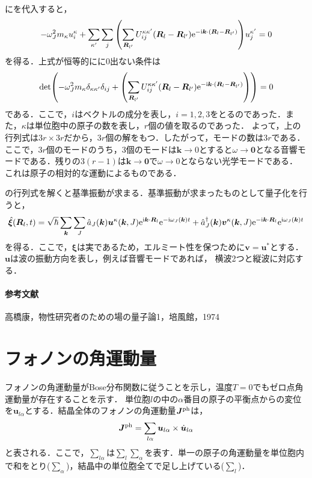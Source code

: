 \documentclass{report}
\begin{document}
にを代入すると，
\begin{align}
  -\omega_J^2 m_\kappa u_{i}^{\kappa} + \sum_{\kappa'} \sum_{j} \qty(\sum_{\bm{R}_{l'}} U_{ij}^{\kappa\kappa'}(\bm{R}_l - \bm{R}_{l'})\mathrm{e}^{-\mathrm{i}\bm{k}\cdot(\bm{R}_l-\bm{R}_{l'})}) u_j^{\kappa'}=0
\end{align}
を得る．上式が恒等的にに0出ない条件は
\begin{align}
  \det(-\omega_J^2 m_{\kappa}\delta_{\kappa\kappa'}\delta_{ij} + \qty(\sum_{\bm{R}_{l'}} U_{ij}^{\kappa\kappa'}(\bm{R}_l - \bm{R}_{l'})\mathrm{e}^{-\mathrm{i}\bm{k}\cdot(\bm{R}_l-\bm{R}_{l'})})) = 0 \label{det}
\end{align}
である．ここで，$i$はベクトルの成分を表し，$i=1,2,3$をとるのであった．また，$\kappa$は単位胞中の原子の数を表し，$r$個の値を取るのであった．
よって，上の行列式は$3r\times 3r$だから，$3r$個の解をもつ．したがって，モードの数は$3r$である．ここで，$3r$個のモードのうち，3個のモードは$\bm{k}\to0$とすると$\omega\to\bm{0}$となる音響モードである．残りの$3(r-1)$は$\bm{k}\to\bm{0}$で$\omega\to0$とならない光学モードである．
これは原子の相対的な運動によるものである．

の行列式を解くと基準振動が求まる．基準振動が求まったものとして量子化を行うと，
\begin{align}
  \hat{\bm{\xi}} (\bm{R}_l,t) = \sqrt{\hbar}\sum_{\bm{k}}\sum_{J} \hat{a}_J (\bm{k})\bm{u}^{\kappa}(\bm{k},J)\mathrm{e}^{\mathrm{i}\bm{k}\cdot\bm{R}_l}\mathrm{e}^{-\mathrm{i}\omega_J(\bm{k})t} + \hat{a}^{\dagger}_{J}(\bm{k})\bm{v}^{\kappa}(\bm{k},J)\mathrm{e}^{-\mathrm{i}\bm{k}\cdot\bm{R}_l}\mathrm{e}^{\mathrm{i}\omega_J(\bm{k})t}
\end{align}
を得る．ここで，$\bm{\xi}$は実であるため，エルミート性を保つために$\bm{v}=\bm{u}^{*}$とする．$\bm{u}$は波の振動方向を表し，例えば音響モードであれば，
横波2つと縦波に対応する．

\paragraph*{参考文献}
高橋康，物性研究者のための場の量子論1，培風館，1974

\section{フォノンの角運動量}
フォノンの角運動量がBose分布関数に従うことを示し，温度$T=0$でもゼロ点角運動量が存在することを示す．
単位胞$l$の中の$\alpha$番目の原子の平衡点からの変位を$\bm{u}_{l\alpha}$とする．結晶全体のフォノンの角運動量$\bm{J}^{\mathrm{ph}}$は，
\begin{align}
  \bm{J}^{\mathrm{ph}} = \sum_{l\alpha} \bm{u}_{l\alpha} \times \dot{\bm{u}}_{l\alpha}
\end{align}
と表される．ここで，$\sum_{l\alpha}$は$\sum_{l}\sum_{\alpha}$を表す．単一の原子の角運動量を単位胞内で和をとり($\sum_{\alpha}$)，結晶中の単位胞全てで足し上げている($\sum_{l}$)．
\end{document}
